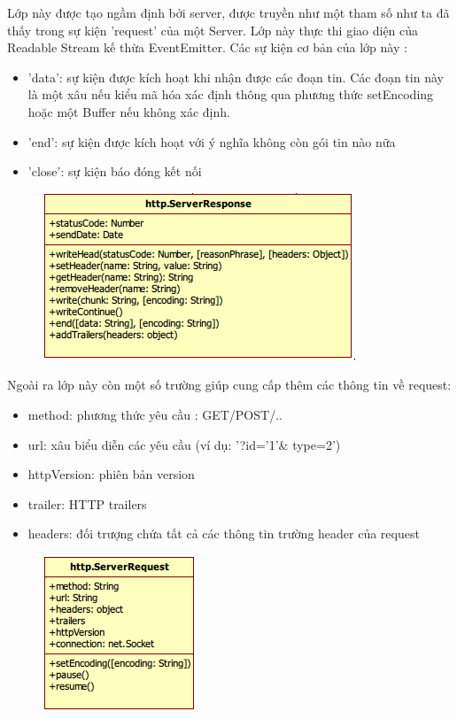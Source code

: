 		Lớp này được tạo ngầm định bởi server, được truyền như một tham số như ta đã thấy trong sự kiện 'request' của một Server. Lớp này thực thi giao diện của Readable Stream kế thừa EventEmitter. Các sự kiện cơ bản của lớp này :
		\begin{itemize}
			\item 'data': sự kiện được kích hoạt khi nhận được các đoạn tin. Các đoạn tin này là một xâu nếu kiểu mã hóa xác định thông qua phương thức setEncoding hoặc một Buffer nếu không xác định.
			\item 'end': sự kiện được kích hoạt với ý nghĩa không còn gói tin nào nữa
			\item 'close': sự kiện báo đóng kết nối
		\end{itemize}
		
		\begin{figure}[h]
			\centering
			\includegraphics[scale=0.7]{3_3_3}
		\end{figure}

		Ngoài ra lớp này còn một số trường giúp cung cấp thêm các thông tin về request:
		\begin{itemize}
			\item method: phương thức yêu cầu : GET/POST/..
			\item url:  xâu biểu diễn các yêu cầu (ví dụ: '?id='1'\& type=2')
			\item httpVersion: phiên bản version
			\item trailer: HTTP trailers
			\item headers: đối trượng chứa tất cả các thông tin trường header của request
		\end{itemize}
		
		\begin{figure}[h]
			\centering
			\includegraphics[scale=0.7]{3_3_4}
		\end{figure}				
		
